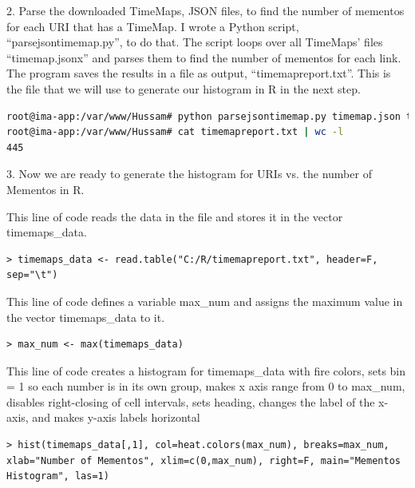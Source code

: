 \documentclass[a4paper, 11pt]{article}
\begin{document}
2. Parse the downloaded TimeMaps, JSON files, to find the number of mementos for each URI that has a TimeMap. I wrote a Python script, ``parsejsontimemap.py'', to do that. The script loops over all TimeMaps' files ``timemap.jsonx'' and parses them to find the number of mementos for each link. The program saves the results in a file as output, ``timemapreport.txt''. This is the file that we will use to generate our histogram in R in the next step.



\begin{lstlisting}[language=bash, breakatwhitespace=〈false), label=Command, caption=Running parsejsontimemap.py]
root@ima-app:/var/www/Hussam# python parsejsontimemap.py timemap.json timemapreport.txt
root@ima-app:/var/www/Hussam# cat timemapreport.txt | wc -l
445
\end{lstlisting}

3. Now we are ready to generate the histogram for URIs vs. the number of Mementos in R.

This line of code reads the data in the file and stores it in the vector timemaps\_data.
\begin{lstlisting}
> timemaps_data <- read.table("C:/R/timemapreport.txt", header=F, sep="\t")
\end{lstlisting}

This line of code defines a variable max\_num and assigns the maximum value in the vector timemaps\_data to it.
\begin{lstlisting}
> max_num <- max(timemaps_data)
\end{lstlisting}

This line of code creates a histogram for timemaps\_data  with fire colors, sets bin = 1 so each number is in its own group, makes x axis range from 0 to max\_num, disables right-closing of cell intervals, sets heading, changes the label of the x-axis, and makes y-axis labels horizontal
\begin{lstlisting}
> hist(timemaps_data[,1], col=heat.colors(max_num), breaks=max_num, xlab="Number of Mementos", xlim=c(0,max_num), right=F, main="Mementos Histogram", las=1)
\end{lstlisting}
\end{document}
